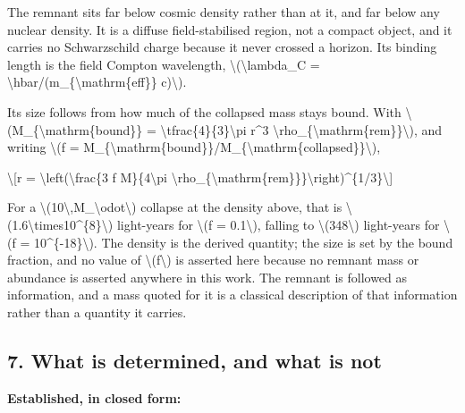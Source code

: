 \documentclass[
  10pt,
]{article}
\begin{document}
The remnant sits far below cosmic density rather than at it, and far
below any nuclear density. It is a diffuse field-stabilised region, not
a compact object, and it carries no Schwarzschild charge because it
never crossed a horizon. Its binding length is the field Compton
wavelength, \textbackslash(\textbackslash lambda\_C =
\textbackslash hbar/(m\_\{\textbackslash mathrm\{eff\}\}
c)\textbackslash).

Its size follows from how much of the collapsed mass stays bound. With
\textbackslash(M\_\{\textbackslash mathrm\{bound\}\} =
\textbackslash tfrac\{4\}\{3\}\textbackslash pi r\^{}3
\textbackslash rho\_\{\textbackslash mathrm\{rem\}\}\textbackslash), and
writing \textbackslash(f =
M\_\{\textbackslash mathrm\{bound\}\}/M\_\{\textbackslash mathrm\{collapsed\}\}\textbackslash),

\textbackslash{[}r = \textbackslash left(\textbackslash frac\{3 f
M\}\{4\textbackslash pi
\textbackslash rho\_\{\textbackslash mathrm\{rem\}\}\}\textbackslash right)\^{}\{1/3\}\textbackslash{]}

For a
\textbackslash(10\textbackslash,M\_\textbackslash odot\textbackslash)
collapse at the density above, that is
\textbackslash(1.6\textbackslash times10\^{}\{8\}\textbackslash)
light-years for \textbackslash(f = 0.1\textbackslash), falling to
\textbackslash(348\textbackslash) light-years for \textbackslash(f =
10\^{}\{-18\}\textbackslash). The density is the derived quantity; the
size is set by the bound fraction, and no value of
\textbackslash(f\textbackslash) is asserted here because no remnant mass
or abundance is asserted anywhere in this work. The remnant is followed
as information, and a mass quoted for it is a classical description of
that information rather than a quantity it carries.

\hypertarget{what-is-determined-and-what-is-not}{%
\subsection{7. What is determined, and what is
not}\label{what-is-determined-and-what-is-not}}

\textbf{Established, in closed form:}
\end{document}
